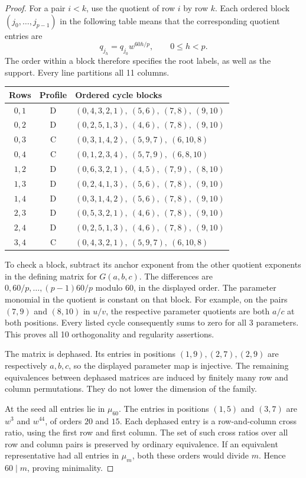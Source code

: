 \documentclass[11pt,a4paper]{article}
\theoremstyle{plain}
\theoremstyle{definition}
\theoremstyle{plain}
\begin{document}
\begin{proof}
For a pair $i<k$, use the quotient of row $i$ by row $k$. Each ordered block $(j_0,\ldots,j_{p-1})$ in the following table means that the corresponding quotient entries are
$$q_{j_h}=q_{j_0}w^{60h/p},\qquad 0\le h<p.$$
The order within a block therefore specifies the root labels, as well as the support. Every line partitions all 11 columns.
\begin{center}
\begin{tabular}{@{}ccl@{}}
\toprule
Rows & Profile & Ordered cycle blocks\\
\midrule
$0,1$ & $\mathrm{D}$ & $(0,4,3,2,1),\ (5,6),\ (7,8),\ (9,10)$\\
$0,2$ & $\mathrm{D}$ & $(0,2,5,1,3),\ (4,6),\ (7,8),\ (9,10)$\\
$0,3$ & $\mathrm{C}$ & $(0,3,1,4,2),\ (5,9,7),\ (6,10,8)$\\
$0,4$ & $\mathrm{C}$ & $(0,1,2,3,4),\ (5,7,9),\ (6,8,10)$\\
$1,2$ & $\mathrm{D}$ & $(0,6,3,2,1),\ (4,5),\ (7,9),\ (8,10)$\\
$1,3$ & $\mathrm{D}$ & $(0,2,4,1,3),\ (5,6),\ (7,8),\ (9,10)$\\
$1,4$ & $\mathrm{D}$ & $(0,3,1,4,2),\ (5,6),\ (7,8),\ (9,10)$\\
$2,3$ & $\mathrm{D}$ & $(0,5,3,2,1),\ (4,6),\ (7,8),\ (9,10)$\\
$2,4$ & $\mathrm{D}$ & $(0,2,5,1,3),\ (4,6),\ (7,8),\ (9,10)$\\
$3,4$ & $\mathrm{C}$ & $(0,4,3,2,1),\ (5,9,7),\ (6,10,8)$\\
\bottomrule
\end{tabular}
\end{center}
To check a block, subtract its anchor exponent from the other quotient exponents in the defining matrix for $G(a,b,c)$. The differences are $0,60/p,\ldots,(p-1)60/p$ modulo $60$, in the displayed order. The parameter monomial in the quotient is constant on that block. For example, on the pairs $(7,9)$ and $(8,10)$ in $u/v$, the respective parameter quotients are both $a/c$ at both positions. Every listed cycle consequently sums to zero for all 3 parameters. This proves all 10 orthogonality and regularity assertions.

The matrix is dephased. Its entries in positions $(1,9),(2,7),(2,9)$ are respectively $a,b,c$, so the displayed parameter map is injective. The remaining equivalences between dephased matrices are induced by finitely many row and column permutations. They do not lower the dimension of the family.

At the seed all entries lie in $\mu_{60}$. The entries in positions $(1,5)$ and $(3,7)$ are $w^{3}$ and $w^{44}$, of orders $20$ and $15$. Each dephased entry is a row-and-column cross ratio, using the first row and first column. The set of such cross ratios over all row and column pairs is preserved by ordinary equivalence. If an equivalent representative had all entries in $\mu_m$, both these orders would divide $m$. Hence $60\mid m$, proving minimality.
\end{proof}
\end{document}
